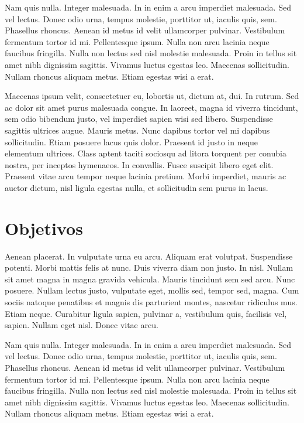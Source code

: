 Nam quis nulla. Integer malesuada. In in enim a arcu imperdiet malesuada. Sed vel lectus. Donec odio urna, tempus molestie, porttitor ut, iaculis quis, sem. Phasellus rhoncus. Aenean id metus id velit ullamcorper pulvinar. Vestibulum fermentum tortor id mi. Pellentesque ipsum. Nulla non arcu lacinia neque faucibus fringilla. Nulla non lectus sed nisl molestie malesuada. Proin in tellus sit amet nibh dignissim sagittis. Vivamus luctus egestas leo. Maecenas sollicitudin. Nullam rhoncus aliquam metus. Etiam egestas wisi a erat.

Maecenas ipsum velit, consectetuer eu, lobortis ut, dictum at, dui. In rutrum. Sed ac dolor sit amet purus malesuada congue. In laoreet, magna id viverra tincidunt, sem odio bibendum justo, vel imperdiet sapien wisi sed libero. Suspendisse sagittis ultrices augue. Mauris metus. Nunc dapibus tortor vel mi dapibus sollicitudin. Etiam posuere lacus quis dolor. Praesent id justo in neque elementum ultrices. Class aptent taciti sociosqu ad litora torquent per conubia nostra, per inceptos hymenaeos. In convallis. Fusce suscipit libero eget elit. Praesent vitae arcu tempor neque lacinia pretium. Morbi imperdiet, mauris ac auctor dictum, nisl ligula egestas nulla, et sollicitudin sem purus in lacus.


\section{Objetivos}

Aenean placerat. In vulputate urna eu arcu. Aliquam erat volutpat. Suspendisse potenti. Morbi mattis felis at nunc. Duis viverra diam non justo. In nisl. Nullam sit amet magna in magna gravida vehicula. Mauris tincidunt sem sed arcu. Nunc posuere. Nullam lectus justo, vulputate eget, mollis sed, tempor sed, magna. Cum sociis natoque penatibus et magnis dis parturient montes, nascetur ridiculus mus. Etiam neque. Curabitur ligula sapien, pulvinar a, vestibulum quis, facilisis vel, sapien. Nullam eget nisl. Donec vitae arcu.

Nam quis nulla. Integer malesuada. In in enim a arcu imperdiet malesuada. Sed vel lectus. Donec odio urna, tempus molestie, porttitor ut, iaculis quis, sem. Phasellus rhoncus. Aenean id metus id velit ullamcorper pulvinar. Vestibulum fermentum tortor id mi. Pellentesque ipsum. Nulla non arcu lacinia neque faucibus fringilla. Nulla non lectus sed nisl molestie malesuada. Proin in tellus sit amet nibh dignissim sagittis. Vivamus luctus egestas leo. Maecenas sollicitudin. Nullam rhoncus aliquam metus. Etiam egestas wisi a erat.

